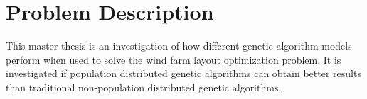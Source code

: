 \section*{Problem Description}
This master thesis is an investigation of how different genetic algorithm models perform when used to solve the wind farm layout optimization problem. It is investigated if population distributed genetic algorithms can obtain better results than traditional non-population distributed genetic algorithms. 